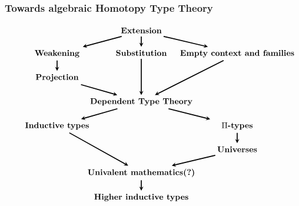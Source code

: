 \documentclass{beamer}
\begin{document}
\begin{frame}
\frametitle{\bf Towards algebraic Homotopy Type Theory}
\begin{footnotesize}
\begin{equation*}
\begin{tikzcd}[ampersand replacement=\&,column sep=0em,row sep=1.3em]
 {}\& 
\textbf{Extension} 
  \ar[very thick,-stealth]{dr} 
  \ar[very thick,-stealth]{d} 
  \ar[very thick,-stealth]{dl}
  \\
\makebox[2cm]{\textbf{Weakening}} 
  \ar[very thick,-stealth]{d} 
  \& 
\textbf{Substitution} 
  \ar[very thick,-stealth]{dd} 
  \& 
\makebox[3cm]{\textbf{Empty context and families}} 
  \ar[very thick,-stealth]{ddl}
  \\
\makebox[2cm]{\textbf{Projection}} 
  \ar[very thick,-stealth]{dr}
  \\
  {}\& 
\textbf{Dependent Type Theory}
  \ar[very thick,-stealth]{dr}
  \ar[very thick,-stealth]{dl}
  \\
\makebox[2cm]{\bf Inductive types}
  \ar[very thick,-stealth]{ddr}
  \&\&
\makebox[2cm]{\bf $\Pi$-types}
  \ar[very thick,-stealth]{d}
  \\
  {}\&
  {}\&
\makebox[2cm]{\bf Universes}
  \ar[very thick,-stealth]{dl}
  \\
  {}\&
\mbox{\bf Univalent mathematics(?)}
  \ar[very thick,-stealth]{d}
  \\
  {}\&
\mbox{\bf Higher inductive types}
\end{tikzcd}
\end{equation*}
\end{footnotesize}
\end{frame}
\end{document}
